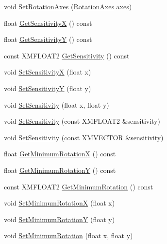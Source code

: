 \begin{DoxyCompactItemize}
\item 
void \hyperlink{classmage_1_1_mouse_look_script_a4a1818161f8bc245399cf3b77ff41b53}{Set\+Rotation\+Axes} (\hyperlink{namespacemage_a548e5c31b08a1078841ed21948f5bf4c}{Rotation\+Axes} axes)
\item 
float \hyperlink{classmage_1_1_mouse_look_script_a5ba6c96a6d73050bc0c9903f376dbd93}{Get\+SensitivityX} () const
\item 
float \hyperlink{classmage_1_1_mouse_look_script_a154e0de56755e927ee0731a6f3159e55}{Get\+SensitivityY} () const
\item 
const X\+M\+F\+L\+O\+A\+T2 \hyperlink{classmage_1_1_mouse_look_script_a942a751f1b6ed77bf2562b4f17dc108c}{Get\+Sensitivity} () const
\item 
void \hyperlink{classmage_1_1_mouse_look_script_a3e69c06a6044206e4ea1b89ea46f373a}{Set\+SensitivityX} (float x)
\item 
void \hyperlink{classmage_1_1_mouse_look_script_a8e26c1611c8f88fd848506d215a07533}{Set\+SensitivityY} (float y)
\item 
void \hyperlink{classmage_1_1_mouse_look_script_ac53d16f789083f4d3fd43c0e75db8776}{Set\+Sensitivity} (float x, float y)
\item 
void \hyperlink{classmage_1_1_mouse_look_script_afb4e47a84781a03d51ba4c509c7dce41}{Set\+Sensitivity} (const X\+M\+F\+L\+O\+A\+T2 \&sensitivity)
\item 
void \hyperlink{classmage_1_1_mouse_look_script_a94c4d1c69113b1dcdbd37c200885f0e8}{Set\+Sensitivity} (const X\+M\+V\+E\+C\+T\+OR \&sensitivity)
\item 
float \hyperlink{classmage_1_1_mouse_look_script_a6e1369c198e1d462f6fd30693f190d86}{Get\+Minimum\+RotationX} () const
\item 
float \hyperlink{classmage_1_1_mouse_look_script_a31f85ac897e436ebfff3d709b58eb435}{Get\+Minimum\+RotationY} () const
\item 
const X\+M\+F\+L\+O\+A\+T2 \hyperlink{classmage_1_1_mouse_look_script_aa0ee621d5f42580f45a324ce856f2c82}{Get\+Minimum\+Rotation} () const
\item 
void \hyperlink{classmage_1_1_mouse_look_script_a17d27b08898ad03f50f713571ed5bf04}{Set\+Minimum\+RotationX} (float x)
\item 
void \hyperlink{classmage_1_1_mouse_look_script_ad6c5231889eb69cb549fe69417c97532}{Set\+Minimum\+RotationY} (float y)
\item 
void \hyperlink{classmage_1_1_mouse_look_script_ac84f53324f75f360ea87a9565c031623}{Set\+Minimum\+Rotation} (float x, float y)

\end{DoxyCompactItemize}
